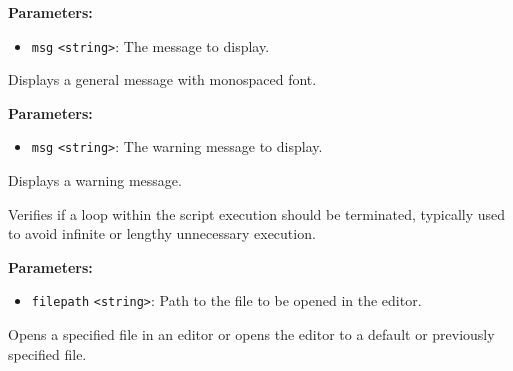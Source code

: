 \documentclass[12pt,a4paper]{article}
\begin{document}
\vspace{5mm}
\noindent {}


\noindent \textbf{Parameters:}
\begin{itemize}
  \item \texttt{msg} \texttt{<string>}: The message to display.
\end{itemize}

\noindent Displays a general message with monospaced font.

\vspace{5mm}
\noindent {}


\noindent \textbf{Parameters:}
\begin{itemize}
  \item \texttt{msg} \texttt{<string>}: The warning message to display.
\end{itemize}

\noindent Displays a warning message.

\vspace{5mm}
\noindent {}


\noindent Verifies if a loop within the script execution should be terminated, typically used to avoid infinite or lengthy unnecessary execution.

\vspace{5mm}
\noindent {}


\noindent \textbf{Parameters:}
\begin{itemize}
  \item \texttt{filepath} \texttt{<string>}: Path to the file to be opened in the editor.
\end{itemize}

\noindent Opens a specified file in an editor or opens the editor to a default or previously specified file.

\vspace{5mm}
\noindent {}
\end{document}

